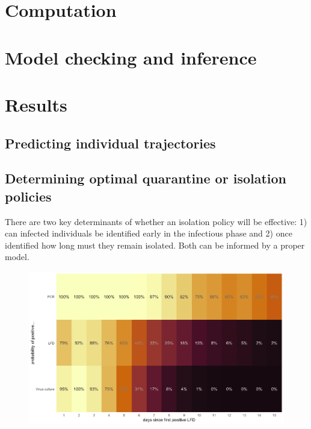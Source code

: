 \documentclass[12pt]{article}
\begin{document}
\section{Computation}

\section{Model checking and inference}

\section{Results}

\subsection{Predicting individual trajectories}

\subsection{Determining optimal quarantine or isolation policies}

There are two key determinants of whether an isolation policy will be effective: 1) can infected individuals be identified early in the infectious phase and 2) once identified how long must they remain isolated. Both can be informed by a proper model. 

\begin{figure}[p]
    \centering
    \includegraphics[width=\linewidth]{../3_figures/probability.png}
    \caption{}
\end{figure}
\end{document}
